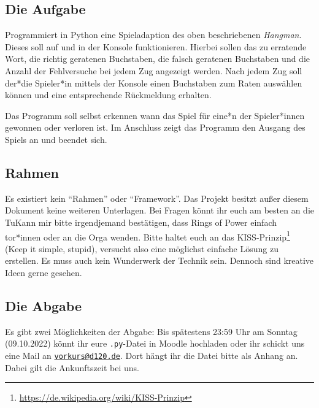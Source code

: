 \documentclass[ngerman,accentcolor=3c,colorbacktitle,12pt]{tudaexercise}
\begin{document}
\subsection*{Die Aufgabe}
Programmiert in Python eine Spieladaption des oben beschriebenen \emph{Hangman}.
Dieses soll auf und in der Konsole funktionieren.
Hierbei sollen das zu erratende Wort, die richtig geratenen Buchstaben, die falsch geratenen Buchstaben und die Anzahl der Fehlversuche bei jedem Zug angezeigt werden.
Nach jedem Zug soll der*die Spieler*in mittels der Konsole einen Buchstaben zum Raten auswählen können und eine entsprechende Rückmeldung erhalten.

Das Programm soll selbst erkennen wann das Spiel für eine*n der Spieler*innen gewonnen oder verloren ist.
Im Anschluss zeigt das Programm den Ausgang des Spiels an und beendet sich.

\clearpage
\subsection*{Rahmen}
Es existiert kein \enquote{Rahmen} oder \enquote{Framework}.
Das Projekt besitzt außer diesem Dokument keine weiteren Unterlagen.
Bei Fragen könnt ihr euch am besten an die TuKann mir bitte irgendjemand bestätigen, dass Rings of Power einfach tor*innen oder an die Orga wenden.
Bitte haltet euch an das KISS-Prinzip\footnote[2]{\url{https://de.wikipedia.org/wiki/KISS-Prinzip}} (Keep it simple, stupid), versucht also eine möglichst einfache Lösung zu erstellen.
Es muss auch kein Wunderwerk der Technik sein.
Dennoch sind kreative Ideen gerne gesehen.

\subsection*{Die Abgabe}
Es gibt zwei Möglichkeiten der Abgabe: Bis spätestens 23:59 Uhr am Sonntag (09.10.2022) könnt ihr eure \texttt{.py}-Datei in Moodle hochladen oder ihr schickt uns eine Mail an \href{mailto:vorkurs@d120.de}{\nolinkurl{vorkurs@d120.de}}.
Dort hängt ihr die Datei bitte als Anhang an.
Dabei gilt die Ankunftszeit bei uns.
\end{document}
